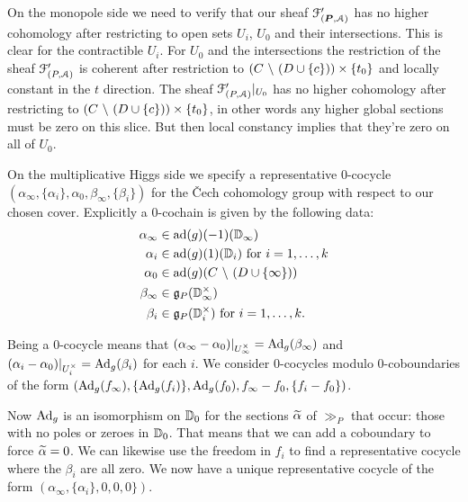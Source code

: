 \documentclass[10pt, oneside]{article}
\renewcommand{\ad}{\mr{ad}}
\begin{document}
On the monopole side we need to verify that our sheaf $\mathcal{F}'_{(\boldsymbol{P},\mathcal{A})}$ has no higher cohomology after restricting to open sets $U_i$, $U_0$ and their intersections.  This is clear for the contractible $U_i$.  For $U_0$ and the intersections the restriction of the sheaf  $\mathcal{F}'_{(P,\mathcal{A})}$ is coherent after restriction to $(C \ \backslash \  (D \cup \{c\})) \times \{t_0\}$ and locally constant in the $t$ direction.  The sheaf $\mathcal{F}'_{(P,\mathcal{A})}|_{U_0}$ has no higher cohomology after restricting to $(C \ \backslash \  (D \cup \{c\})) \times \{t_0\}$, in other words any higher global sections must be zero on this slice.  But then local constancy implies that they're zero on all of $U_0$. 

On the multiplicative Higgs side we specify a representative 0-cocycle $(\alpha_\infty, \{\alpha_i\}, \alpha_0, \beta_\infty, \{\beta_i\})$ for the \v Cech cohomology group with respect to our chosen cover.  Explicitly a 0-cochain is given by the following data:
\begin{align*}
 \alpha_\infty &\in \ad(g)(-1)(\bb D_\infty) \\
 \alpha_i &\in \ad(g)(1)(\bb D_i) \text{ for } i = 1,\ldots,k \\
 \alpha_0 &\in \ad(g)(C \bs (D \cup \{\infty\})) \\
 \beta_\infty &\in \gg_P(\bb D^\times_\infty) \\
 \beta_i &\in \gg_P(\bb D^\times_i) \text{ for } i=1,\ldots,k.
\end{align*}

Being a 0-cocycle means that $(\alpha_\infty - \alpha_0)|_{U^\times_\infty} = \mathrm{Ad}_g(\beta_\infty)$ and $(\alpha_i - \alpha_0)|_{U^\times_i} = \mathrm{Ad}_g(\beta_i)$ for each $i$.  We consider 0-cocycles modulo 0-coboundaries of the form $(\mathrm{Ad}_g(f_\infty), \{\mathrm{Ad}_g(f_i)\}, \mathrm{Ad}_g(f_0), f_\infty -  f_0, \{f_i - f_0\})$.  

Now $\mathrm{Ad}_g$ is an isomorphism on $\mathbb{D}_0$ for the sections $\widetilde{\alpha}$ of $\gg_P$ that occur: those with no poles or zeroes in $\mathbb{D}_0$.  That means that we can add a coboundary to force $\widetilde{\alpha}=0$.  We can likewise use the freedom in $f_i$ to find a representative cocycle where the $\beta_i$ are all zero.  We now have a unique representative cocycle of the form $(\alpha_\infty, \{\alpha_i\}, 0,0,0\})$.
\end{document}

